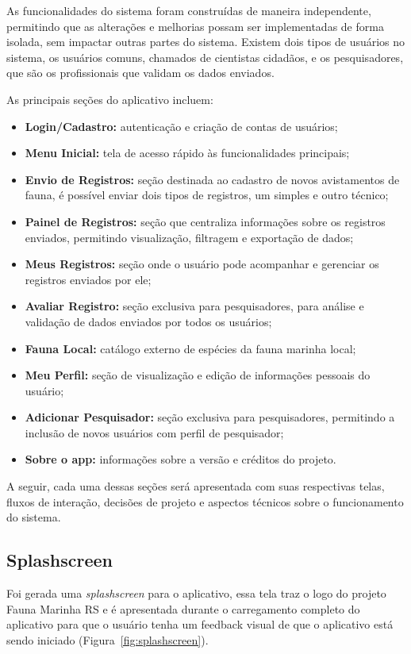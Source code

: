 As funcionalidades do sistema foram construídas de maneira independente,
permitindo que as alterações e melhorias possam ser implementadas de forma isolada, 
sem impactar outras partes do sistema. Existem dois tipos de usuários no sistema, os usuários comuns, 
chamados de cientistas cidadãos, e os pesquisadores, que são os profissionais que validam os dados 
enviados. 

As principais seções do aplicativo incluem:

\begin{itemize}
    \item \textbf{Login/Cadastro:} autenticação e criação de contas de usuários;
    \item \textbf{Menu Inicial:} tela de acesso rápido às funcionalidades principais;
    \item \textbf{Envio de Registros:} seção destinada ao cadastro de novos avistamentos de fauna, é possível enviar dois tipos de registros, um simples e outro técnico;
    \item \textbf{Painel de Registros:} seção que centraliza informações sobre os registros enviados, permitindo visualização, filtragem e exportação de dados;
    \item \textbf{Meus Registros:} seção onde o usuário pode acompanhar e gerenciar os registros enviados por ele;
    \item \textbf{Avaliar Registro:} seção exclusiva para pesquisadores, para análise e validação de dados enviados por todos os usuários;
    \item \textbf{Fauna Local:} catálogo externo de espécies da fauna marinha local;
    \item \textbf{Meu Perfil:} seção de visualização e edição de informações pessoais do usuário;
    \item \textbf{Adicionar Pesquisador:} seção exclusiva para pesquisadores, permitindo a inclusão de novos usuários com perfil de pesquisador;
    \item \textbf{Sobre o app:} informações sobre a versão e créditos do projeto.
\end{itemize}

A seguir, cada uma dessas seções será apresentada com suas respectivas telas, fluxos de interação, 
decisões de projeto e aspectos técnicos sobre o funcionamento do sistema.

\subsection{Splashscreen}
Foi gerada uma \textit{splashscreen} para o aplicativo, essa tela traz o logo do projeto 
Fauna Marinha RS e é apresentada durante o carregamento completo do aplicativo 
para que o usuário tenha um feedback visual de que o aplicativo está sendo iniciado (Figura~\ref{fig:splashscreen}).

